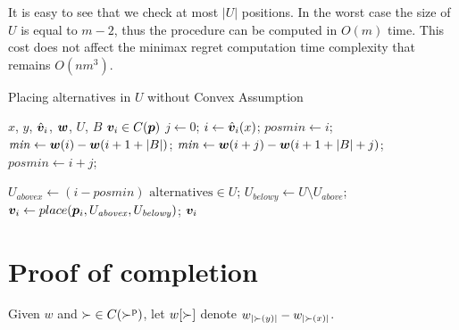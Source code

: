 It is easy to see that we check at most $|U|$ positions. In the worst case the size of $U$ is equal to $m-2$, thus the procedure can be computed in $O(m)$ time. This cost does not affect the minimax regret computation time complexity that remains $O(nm^3)$.

\begin{algorithm}[h] 
	\caption{Placing alternatives in $U$ without Convex Assumption}
	\label{alg:splittingU} 
	\begin{algorithmic}
		\Require $x$, $y$, $\hat{\bm{v}}_i$, $\bm{w}$, $U$, $B$
		\Ensure $\bm{v}_i \in C(\bm{p})$
		\Statex
		\State $ j \gets 0$;
		\State $ i \gets \hat{\bm{v}}_i(x)$;
		\State $ \mathit{posmin} \gets i$;
		\State $ \mathit{min} \gets \bm{w}(i) - \bm{w}(i+1+|B|)$;
		\State $ \mathit{min} \gets \bm{w}(i+j) - \bm{w}(i+1+|B|+j)$;
		\State $ \mathit{posmin} \gets i+j$;
		\EndIf
		\EndWhile
		
		\State $U_{\mathit{abovex}} \gets (i-\mathit{posmin}) \text{ alternatives} \in U $;
		\State $U_{\mathit{belowy}} \gets U \setminus U_{\mathit{above}}$;
		\Statex
		\State $\bm{v}_i \gets place(\bm{p}_i,U_{\mathit{abovex}},U_{\mathit{belowy}})$;
		\Statex \Return $\bm{v}_i$
		
	\end{algorithmic}
\end{algorithm}

% 
% 
% 
%
%
%

\section{Proof of completion}
\label{sec:prfCompl}
Given $w$ and ${\succ} \in C(\succ^\text{p})$, let $w[\succ]$ denote $w_{|\succ(y)|} - w_{|\succ(x)|}$. 

